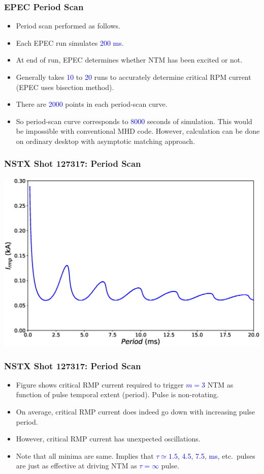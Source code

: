 \documentclass{beamer}
\newcommand{\blue}[1]{\textcolor{blue}{#1}}
\begin{document}
\begin{frame}
\frametitle{EPEC Period Scan}
\begin{itemize}
\item Period scan performed as follows. 
\item Each EPEC run simulates \blue{200 ms}. 
\item At end of run, EPEC determines whether NTM
has been excited or not. 
\item Generally takes \blue{10} to \blue{20} runs to accurately determine critical RPM current (EPEC uses
bisection method). 
\item There are \blue{2000} points in each period-scan curve. 
\item So period-scan curve corresponds to \blue{8000} seconds of simulation.  This would be impossible with
conventional MHD code. However, calculation can be done on ordinary desktop with asymptotic matching approach.
\end{itemize}
\end{frame}


\begin{frame}
\frametitle{NSTX Shot 127317: Period Scan}
\begin{center}
\includegraphics[width=\textwidth]{PeriodScan0.eps}
\end{center}

\end{frame}

\begin{frame}
\frametitle{NSTX Shot 127317: Period Scan}
\begin{itemize}
\item Figure shows critical RMP current required to trigger \blue{$m=3$} NTM as function of pulse temporal extent (period).
Pulse is non-rotating. 

\item On average, critical RMP current does indeed go down with increasing pulse period.
\item However, critical RMP current has unexpected oscillations. 
\item Note that all minima are same. Implies that \blue{$\tau\simeq 1.5$}, \blue{4.5}, \blue{7.5}, \blue{ms}, etc.\ pulses are just as effective
at driving NTM as \blue{$\tau=\infty$} pulse. 
\end{itemize}
\end{frame}
\end{document}
